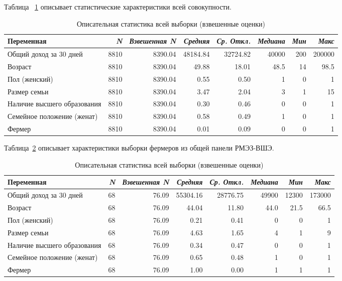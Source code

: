 \documentclass[14pt, a4paper]{article}
\begin{document}
	Таблица ~\ref{tab:desc_stats_ttl} описывает статистические характеристики всей совокупности.
	\begin{table}[htbp]
		\centering
		\caption{Описательная статистика всей выборки (взвешенные оценки)}
		\label{tab:desc_stats_ttl}
		\begin{tabular}{l r r r r r r r}
			\toprule\toprule
			Переменная & \textit{N} & \textit{Взвешенная N} & \textit{Средняя} & \textit{Ср. Откл.} & \textit{Медиана} & \textit{Мин} & \textit{Макс} \\
			\midrule
			Общий доход за 30 дней      & 8810 & 8390.04 & 48184.84 & 32724.82 & 40000 & 200 & 200000 \\
			Возраст                     & 8810 & 8390.04 & 49.88    & 18.01    & 48.5  & 14  & 98.5   \\
			Пол (женский)               & 8810 & 8390.04 & 0.55     & 0.50     & 1     & 0   & 1      \\
			Размер семьи                & 8810 & 8390.04 & 3.47     & 2.04     & 3     & 1   & 15     \\
			Наличие высшего образования & 8810 & 8390.04 & 0.30     & 0.46     & 0     & 0   & 1      \\
			Семейное положение (женат)  & 8810 & 8390.04 & 0.58     & 0.49     & 1     & 0   & 1      \\
			Фермер                      & 8810 & 8390.04 & 0.01     & 0.09     & 0     & 0   & 1      \\
			\bottomrule
		\end{tabular}
	\end{table}
	
	Таблица~\ref{tab:desc_stats_farmers} описывает характеристики выборки фермеров из общей панели РМЭЗ-ВШЭ. 
	\begin{table}[htbp]
		\centering
		\caption{Описательная статистика всей выборки (взвешенные оценки)}
		\label{tab:desc_stats_farmers}
		\begin{tabular}{l r r r r r r r}
			\toprule\toprule
			Переменная & \textit{N} & \textit{Взвешенная N} & \textit{Средняя} & \textit{Ср. Откл.} & \textit{Медиана} & \textit{Мин} & \textit{Макс} \\
			\midrule
			Общий доход за 30 дней      & 68 & 76.09 & 55304.16 & 28776.75 & 49900 & 12300 & 173000 \\
			Возраст                     & 68 & 76.09 & 44.04    & 11.80    & 44.0  & 21.5  & 66.5   \\
			Пол (женский)               & 68 & 76.09 & 0.21     & 0.41     & 0     & 0     & 1      \\
			Размер семьи                & 68 & 76.09 & 4.63     & 1.65     & 4     & 1     & 9      \\
			Наличие высшего образования & 68 & 76.09 & 0.34     & 0.47     & 0     & 0     & 1      \\
			Семейное положение (женат)  & 68 & 76.09 & 0.65     & 0.48     & 1     & 0     & 1      \\
			Фермер                      & 68 & 76.09 & 1.00     & 0.00     & 1     & 1     & 1      \\
			\bottomrule
		\end{tabular}
	\end{table}
	
\end{document}
